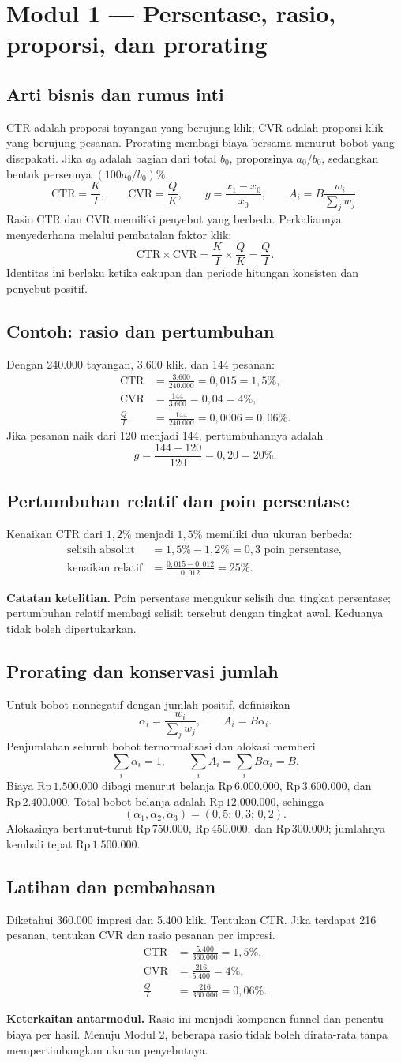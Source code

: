 \documentclass[11pt,a4paper]{article}
\newcommand{\modul}[2]{\clearpage\section{Modul #1 --- #2}}
\newcommand{\bagian}[1]{\Needspace{5\baselineskip}\subsection{#1}}
\newcommand{\catatan}[1]{\par\textbf{Catatan ketelitian.} #1\par}
\newcommand{\jembatan}[1]{\par\textbf{Keterkaitan antarmodul.} #1\par}
\newcommand{\CTR}{\mathrm{CTR}}
\newcommand{\CVR}{\mathrm{CVR}}
\newcommand{\rp}[1]{\ensuremath{\mathrm{Rp}\,#1}}
\begin{document}
\modul{1}{Persentase, rasio, proporsi, dan prorating}
\bagian{Arti bisnis dan rumus inti}
CTR adalah proporsi tayangan yang berujung klik; CVR adalah proporsi klik yang berujung pesanan. Prorating membagi biaya bersama menurut bobot yang disepakati. Jika \(a_0\) adalah bagian dari total \(b_0\), proporsinya \(a_0/b_0\), sedangkan bentuk persennya \((100a_0/b_0)\%\).
\[
\CTR=\frac{K}{I},\qquad \CVR=\frac{Q}{K},\qquad
 g=\frac{x_1-x_0}{x_0},\qquad A_i=B\frac{w_i}{\sum_j w_j}.
\]
Rasio CTR dan CVR memiliki penyebut yang berbeda. Perkaliannya menyederhana melalui pembatalan faktor klik:
\[
\CTR\times\CVR=\frac{K}{I}\times\frac{Q}{K}=\frac{Q}{I}.
\]
Identitas ini berlaku ketika cakupan dan periode hitungan konsisten dan penyebut positif.

\bagian{Contoh: rasio dan pertumbuhan}
Dengan 240.000 tayangan, 3.600 klik, dan 144 pesanan:
\[
\begin{aligned}
\CTR&=\frac{3.600}{240.000}=0{,}015=1{,}5\%,\\
\CVR&=\frac{144}{3.600}=0{,}04=4\%,\\
\frac{Q}{I}&=\frac{144}{240.000}=0{,}0006=0{,}06\%.
\end{aligned}
\]
Jika pesanan naik dari 120 menjadi 144, pertumbuhannya adalah
\[
g=\frac{144-120}{120}=0{,}20=20\%.
\]
\bagian{Pertumbuhan relatif dan poin persentase}
Kenaikan CTR dari \(1{,}2\%\) menjadi \(1{,}5\%\) memiliki dua ukuran berbeda:
\[
\begin{aligned}
\text{selisih absolut}&=1{,}5\%-1{,}2\%=0{,}3\text{ poin persentase},\\
\text{kenaikan relatif}&=\frac{0{,}015-0{,}012}{0{,}012}=25\%.
\end{aligned}
\]
\catatan{Poin persentase mengukur selisih dua tingkat persentase; pertumbuhan relatif membagi selisih tersebut dengan tingkat awal. Keduanya tidak boleh dipertukarkan.}

\bagian{Prorating dan konservasi jumlah}
Untuk bobot nonnegatif dengan jumlah positif, definisikan
\[
\alpha_i=\frac{w_i}{\sum_jw_j},\qquad A_i=B\alpha_i.
\]
Penjumlahan seluruh bobot ternormalisasi dan alokasi memberi
\[
\sum_i\alpha_i=1,\qquad \sum_iA_i=\sum_i B\alpha_i=B.
\]
Biaya \rp{1.500.000} dibagi menurut belanja \rp{6.000.000}, \rp{3.600.000}, dan \rp{2.400.000}. Total bobot belanja adalah \rp{12.000.000}, sehingga
\[
(\alpha_1,\alpha_2,\alpha_3)=(0{,}5;\,0{,}3;\,0{,}2).
\]
Alokasinya berturut-turut \rp{750.000}, \rp{450.000}, dan \rp{300.000}; jumlahnya kembali tepat \rp{1.500.000}.

\bagian{Latihan dan pembahasan}
Diketahui 360.000 impresi dan 5.400 klik. Tentukan CTR. Jika terdapat 216 pesanan, tentukan CVR dan rasio pesanan per impresi.
\[
\begin{aligned}
\CTR&=\frac{5.400}{360.000}=1{,}5\%,\\
\CVR&=\frac{216}{5.400}=4\%,\\
\frac{Q}{I}&=\frac{216}{360.000}=0{,}06\%.
\end{aligned}
\]
\jembatan{Rasio ini menjadi komponen funnel dan penentu biaya per hasil. Menuju Modul 2, beberapa rasio tidak boleh dirata-rata tanpa mempertimbangkan ukuran penyebutnya.}
\end{document}
